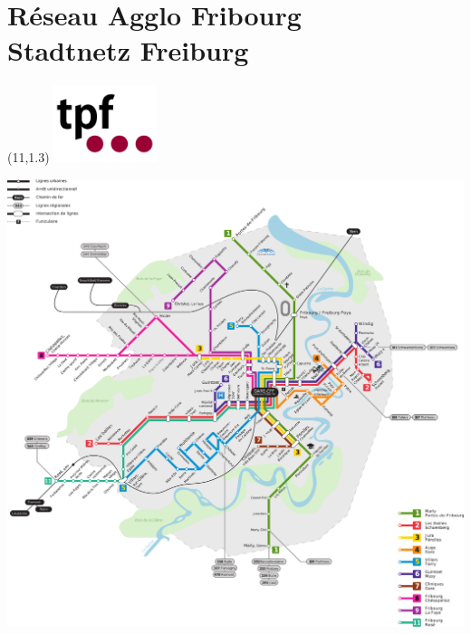\section*{Réseau Agglo Fribourg\\Stadtnetz Freiburg}%
\begin{textblock}{2}(11,1.3)%
\includegraphics[width=3cm]{tpf.pdf}%
\end{textblock}%
\begin{center}
\includegraphics[width=\textwidth]{plan_zone_10.pdf}
\end{center}